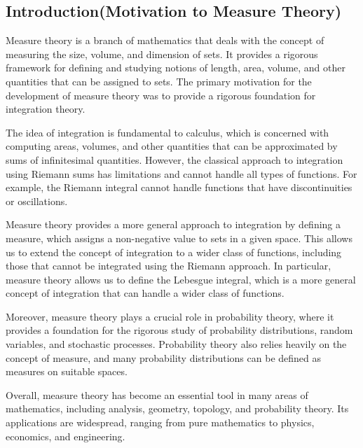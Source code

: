 \documentclass[12pt, a4paper]{article} %
\begin{document}
       
    \begin{tcolorbox}[colback=gray!5!white, colframe=blue!50!black,title=\begin{center}
        \section{ Title of the Project : Lebesgue measurable sets in R}
    \end{center}]
           \subsection{Introduction(Motivation to Measure Theory)}

              Measure theory is a branch of mathematics that deals with the concept of measuring the size, volume, and dimension of sets. It provides a rigorous framework for defining and studying notions of length, area, volume, and other quantities that can be assigned to sets. The primary motivation for the development of measure theory was to provide a rigorous foundation for integration theory.
              
              The idea of integration is fundamental to calculus, which is concerned with computing areas, volumes, and other quantities that can be approximated by sums of infinitesimal quantities. However, the classical approach to integration using Riemann sums has limitations and cannot handle all types of functions. For example, the Riemann integral cannot handle functions that have discontinuities or oscillations.
              
              Measure theory provides a more general approach to integration by defining a measure, which assigns a non-negative value to sets in a given space. This allows us to extend the concept of integration to a wider class of functions, including those that cannot be integrated using the Riemann approach. In particular, measure theory allows us to define the Lebesgue integral, which is a more general concept of integration that can handle a wider class of functions.
              
              Moreover, measure theory plays a crucial role in probability theory, where it provides a foundation for the rigorous study of probability distributions, random variables, and stochastic processes. Probability theory also relies heavily on the concept of measure, and many probability distributions can be defined as measures on suitable spaces.
              
              Overall, measure theory has become an essential tool in many areas of mathematics, including analysis, geometry, topology, and probability theory. Its applications are widespread, ranging from pure mathematics to physics, economics, and engineering.
    \end{tcolorbox}
\end{document}
